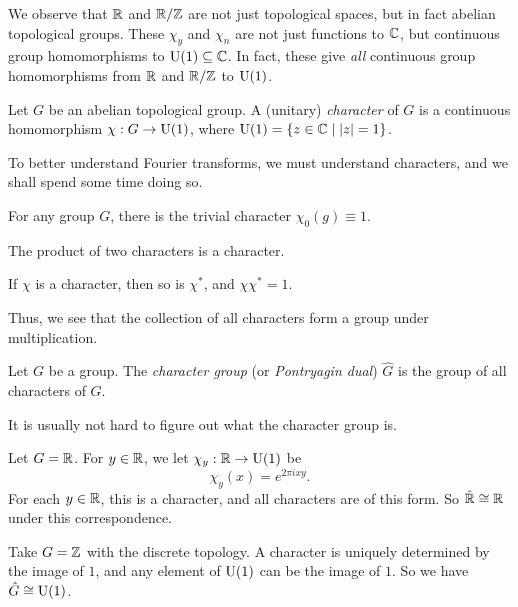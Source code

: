 \documentclass[a4paper]{article}
\begin{document}
We observe that $\mathbb{R}$ and $\mathbb{R}/\mathbb{Z}$ are not just topological spaces, but in fact abelian topological groups. These $\chi_y$ and $\chi_n$ are not just functions to $\mathbb{C}$, but continuous group homomorphisms to $\mathrm{U}(1) \subseteq \mathbb{C}$. In fact, these give \emph{all} continuous group homomorphisms from $\mathbb{R}$ and $\mathbb{R}/\mathbb{Z}$ to $\mathrm{U}(1)$.

\begin{defi}[Character]
  Let $G$ be an abelian topological group. A (unitary) \emph{character} of $G$ is a continuous homomorphism $\chi: G \to \mathrm{U}(1)$, where $\mathrm{U}(1) = \{z \in \mathbb{C} \mid |z| = 1\}$.
\end{defi}
To better understand Fourier transforms, we must understand characters, and we shall spend some time doing so.

\begin{eg}
  For any group $G$, there is the trivial character $\chi_0(g) \equiv 1$.
\end{eg}

\begin{eg}
  The product of two characters is a character.
\end{eg}

\begin{eg}
 If $\chi$ is a character, then so is $\chi^*$, and $\chi \chi^* = 1$.
\end{eg}

Thus, we see that the collection of all characters form a group under multiplication.
\begin{defi}
  Let $G$ be a group. The \emph{character group} (or \emph{Pontryagin dual}) $\hat{G}$ is the group of all characters of $G$.
\end{defi}

It is usually not hard to figure out what the character group is.
\begin{eg}
  Let $G = \mathbb{R}$. For $y \in \mathbb{R}$, we let $\chi_y: \mathbb{R} \to \mathrm{U}(1)$ be
  \[
    \chi_y(x) = e^{2\pi i xy}.
  \]
  For each $y \in \mathbb{R}$, this is a character, and all characters are of this form. So $\hat{\mathbb{R}} \cong \mathbb{R}$ under this correspondence.
\end{eg}

\begin{eg}
  Take $G = \mathbb{Z}$ with the discrete topology. A character is uniquely determined by the image of $1$, and any element of $\mathrm{U}(1)$ can be the image of $1$. So we have $\hat{G} \cong \mathrm{U}(1)$.
\end{eg}
\end{document}
